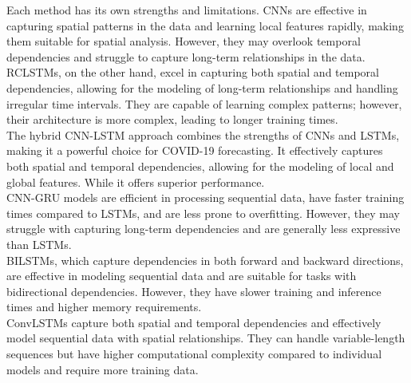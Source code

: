 \documentclass{article}
\begin{document}
Each method has its own strengths and limitations. CNNs are effective in capturing spatial patterns in the data and learning local features rapidly, making them suitable for spatial analysis. However, they may overlook temporal dependencies and struggle to capture long-term relationships in the data.\\
RCLSTMs, on the other hand, excel in capturing both spatial and temporal dependencies, allowing for the modeling of long-term relationships and handling irregular time intervals. They are capable of learning complex patterns; however, their architecture is more complex, leading to longer training times.\\
The hybrid CNN-LSTM approach combines the strengths of CNNs and LSTMs, making it a powerful choice for COVID-19 forecasting. It effectively captures both spatial and temporal dependencies, allowing for the modeling of local and global features. While it offers superior performance.\\
CNN-GRU models are efficient in processing sequential data, have faster training times compared to LSTMs, and are less prone to overfitting. However, they may struggle with capturing long-term dependencies and are generally less expressive than LSTMs.\\
BILSTMs, which capture dependencies in both forward and backward directions, are effective in modeling sequential data and are suitable for tasks with bidirectional dependencies. However, they have slower training and inference times and higher memory requirements.\\
ConvLSTMs capture both spatial and temporal dependencies and effectively model sequential data with spatial relationships. They can handle variable-length sequences but have higher computational complexity compared to individual models and require more training data.
\end{document}
